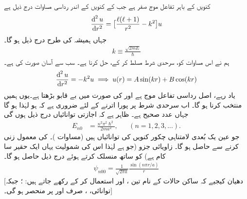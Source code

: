 \quad
کنویں کے باہر تفاعل موج صفر ہے جب کے کنویں کے اندر رداسی مساوات درج ذیل ہے
\begin{align}\label{مساوات_ابعادی_مربعی_کنواں_الف}
\frac{\dif^{\,2}u}{\dif r^{2}}=\big[\frac{\ell(\ell+1)}{r^{2}}-k^{2}\big]u 
\end{align}
جہاں ہمیشہ کی طرح درج ذیل ہو گا۔
\begin{align}
k\equiv\frac{\sqrt{2mE}}{\hslash} 
\end{align}
ہم نے اس مساوات کو، سرحدی شرط  مسلط کر کے، حل کرنا ہے۔ سب سے آسان صورت  کی ہے۔
\begin{align*}
\frac{\dif^{\,2}u}{\dif r^{2}}=-k^{2}u\implies {u(r)=A\sin(kr)+B\cos(kr)} 
\end{align*}
یاد رہے، اصل رداسی تفاعل موج  ہے اور  کی صورت میں  بے قابو بڑھتا ہے۔یوں ہمیں  منتخب کرنا ہو گا۔ اب سرحدی شرط پر پورا اترنے کے لئے ضروری ہے کہ  ہو لہٰذا  ہو گا جہاں  عدد صحیح ہے۔ ظاہر ہے کہ اجازتی توانائیاں درج ذیل ہوں گی
\begin{align}
E_{n0}&=\frac{n^{2}\pi^{2}\hslash^{2}}{2ma^{2}},&&(n=1,2,3,...). 
\end{align}
جو عین یک بُعدی لامتناہی چکور کنویں کی توانائیاں ہیں (مساوات )۔  کی معمول زنی کرنے سے  حاصل ہو گا۔ زاویائی جزو (جو  ہے لہٰذا اس کی شمولیت یہاں ایک حقیر سا کام ہے) کو ساتھ منسلک کرتے ہوئے درج ذیل حاصل ہو گا۔ 
\begin{align}
\psi_{n00}=\frac{1}{\sqrt{2\pi a}}\frac{\sin(n\pi r/a)}{r} 
\end{align}
[دھیان کیجیے کہ ساکن حالات کے نام تین  ،  اور  استعمال کر کے رکھے جاتے ہیں: ؛ جبکہ توانائی، ، صرف  اور  پر منحصر ہو گی۔] 

